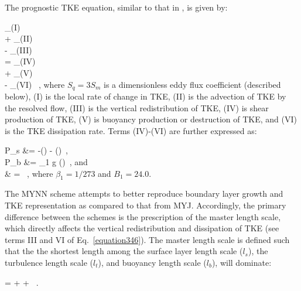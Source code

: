 The prognostic TKE equation, similar to that in  \citet{MY82}, is given by:

  
\be
{}_{(I)} \\
+ _{(II)}\\
- _{(III)} \\
= _{(IV)} \\
+ _{(V)}\\
- _{(VI)} \, ,
\label{equation346}
\ee
\noindent
 where $S_q = 3 S_m$ is a dimensionless eddy flux coefficient (described below), (I) is the local rate of change in TKE, (II) is the advection of TKE by the resolved flow, (III) is the vertical redistribution of TKE, (IV) is shear production of TKE, (V) is buoyancy production or destruction of TKE, and (VI) is the TKE dissipation rate. Terms (IV)-(VI) are further expressed as:

\bse \label{equation347}
\bal
P_s &= -\left(\right) - \left(\right)\, , \label{equation347a}\\
P_b &= \beta_1 g \left(\right)\, , \quad and \label{equation347b} \\
\epsilon & =  \label{equation347c} \, ,
\eal
\ese
\noindent
 where $\beta_1 = 1/273$ and $B_1 = 24.0$.

The MYNN scheme attempts to better reproduce boundary layer growth and TKE representation as compared to that from MYJ. Accordingly, the primary difference between the schemes is the prescription of the master length scale, which directly affects the vertical redistribution and dissipation of TKE (see terms III and VI of Eq.~\ref{equation346}). The master length scale is defined such that the the shortest length among the surface layer length scale ($l_s$), the turbulence length scale ($l_t$), and buoyancy length scale ($l_b$), will dominate:

\be
{} =  +  +  \, .\label{equation348}
\ee


